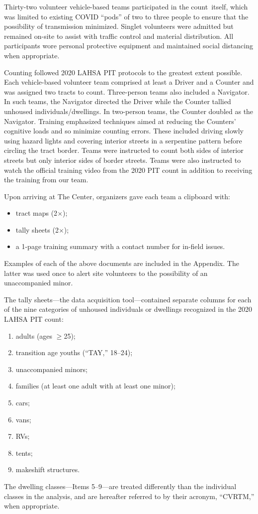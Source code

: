 \documentclass[11pt,twocolumn]{article}
\def\Count{count}
\begin{document}
Thirty-two volunteer vehicle-based teams participated in the \Count\ itself, which was limited to 
existing COVID ``pods'' of two to three people to ensure that the possibility of transmission minimized. 
Singlet volunteers were admitted but remained on-site to assist with traffic control and material distribution. 
All participants wore personal protective equipment and maintained social distancing when appropriate.

Counting followed 2020 LAHSA PIT protocols to the greatest extent possible. Each vehicle-based 
volunteer team comprised at least a Driver and a Counter and was assigned two tracts to count. 
Three-person teams also included a Navigator. In such teams, the Navigator directed the Driver while 
the Counter tallied unhoused individuals/dwellings. In two-person teams, the Counter doubled as 
the Navigator. Training emphasized techniques aimed at reducing the Counters' cognitive loads and 
so minimize counting errors. These included driving slowly using hazard lights and covering interior 
streets in a serpentine pattern before circling the tract border. Teams were instructed to count both 
sides of interior streets but only interior sides of border streets. Teams were also instructed to watch
the official training video from the 2020 PIT count in addition to receiving the training from our
team.

Upon arriving at The Center, organizers gave each team a clipboard with:
\begin{itemize}
	\item tract maps (2$\times$);
	\item tally sheets (2$\times$);
	\item a 1-page training summary with a contact number for in-field issues.
\end{itemize}
Examples of each of the above documents are included in the Appendix. The latter was used 
once to alert site volunteers to the possibility of an unaccompanied minor.

The tally sheets---the data acquisition tool---contained separate columns for each of the nine 
categories of unhoused individuals or dwellings recognized in the 2020 LAHSA PIT count: 
\begin{enumerate}
	\item adults (ages $\geq$25);
	\item transition age youths (``TAY,'' 18--24);
	\item unaccompanied minors;
	\item families (at least one adult with at least one minor); 
	\item cars;
	\item vans;
	\item RVs;
	\item tents;
	\item makeshift structures.
\end{enumerate}
The dwelling classes---Items 5--9---are treated differently than the individual classes in the analysis,
and are hereafter referred to by their acronym, ``CVRTM,'' when appropriate. 
\end{document}

